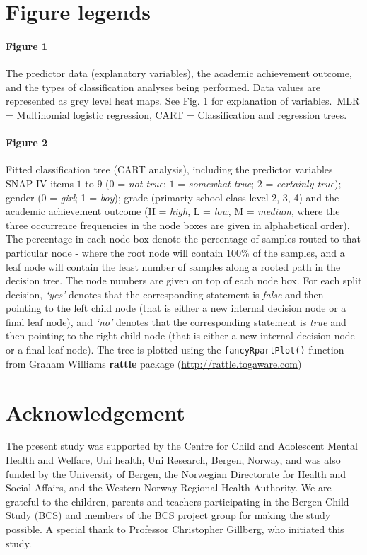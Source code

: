 \documentclass[10pt,letterpaper]{article}
\begin{document}
{{\vspace{5mm}
\section*{Figure legends}
\paragraph{Figure 1} The predictor data (explanatory variables), the academic achievement outcome, and the types of classification analyses being performed. 
Data values are represented as grey level heat maps. See 
Fig. 1 for explanation of variables.\,
MLR = Multinomial logistic regression, CART = Classification and regression trees. \\



\vspace{5mm}

\paragraph{Figure 2} Fitted classification tree (CART analysis),  including the predictor variables SNAP-IV items $1$ to $9$ ($0$ = \emph{not true}; $1$ = \emph{somewhat true};
 $2$ = \emph{certainly true}); gender (0 = \emph{girl}; 1 = \emph{boy}); grade (primarty school class level 2, 3, 4) and the academic achievement outcome (H = \emph{high}, L = \emph{low},  M = \emph{medium}, where the three occurrence frequencies in the node boxes are given in alphabetical order). The percentage in each node box denote the
 percentage of samples routed to that particular node - where the root node will contain 100\% of the samples, and a leaf node will contain the least number of samples along 
 a rooted path in the decision tree.
The node numbers are given on top of each node box. For each split decision, \emph{`yes'} denotes that the corresponding statement is \emph{ false} 
and then pointing to the left child node
(that is either a new internal decision node or a final leaf node), and \emph{`no'}
denotes that the corresponding statement is \emph{true} and then pointing to the right child node (that is either a new internal decision node or a final leaf node).  
The tree is plotted using the {\small \tt fancyRpartPlot()} function from Graham Williams {\bf rattle} package
({\small \url{http://rattle.togaware.com}})


\section*{Acknowledgement}
The present study was supported by the Centre for Child and Adolescent Mental Health and Welfare, Uni health, Uni
Research, Bergen, Norway, and was also funded by the University of Bergen, the Norwegian Directorate for Health and
Social Affairs, and the Western Norway Regional Health Authority. We are grateful to the children, parents and teachers
participating in the Bergen Child Study (BCS) and members of the BCS project group for making the study possible. A
special thank to Professor Christopher Gillberg, who initiated this study.

}}
\end{document}
